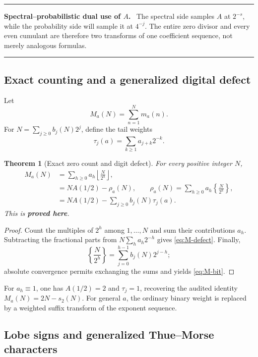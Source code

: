 \documentclass[11pt,oneside]{article}
\numberwithin{equation}{section}
\newtheorem{theorem}{Theorem}[section]
\theoremstyle{definition}
\theoremstyle{remark}
\newcommand{\statusproved}{\textcolor{deepgreen}{\textbf{proved here}}}
\newenvironment{resultbox}[1]{%
  \par\medskip\noindent\begin{center}\begin{minipage}{0.94\textwidth}%
  \color{deepgreen}\hrule\vspace{0.65em}%
  \color{black}\textbf{\color{deepgreen}#1.}\ }{%
  \par\vspace{0.65em}\color{deepgreen}\hrule
  \end{minipage}\end{center}\medskip}
\begin{document}
\begin{resultbox}{Spectral--probabilistic dual use of $A$}
The spectral side samples $A$ at $2^{-s}$, while the probability side will sample it at
$4^{-j}$.  The entire zero divisor and every even cumulant are therefore two transforms of
one coefficient sequence, not merely analogous formulas.
\end{resultbox}

\subsection{Exact counting and a generalized digital defect}

Let
\begin{equation}
 M_a(N)=\sum_{n=1}^{N}m_a(n).
 \label{eq:M-a}
\end{equation}
For $N=\sum_{j\ge0}b_j(N)2^j$, define the tail weights
\begin{equation}
 \tau_j(a)=\sum_{k\ge1}a_{j+k}2^{-k}.
 \label{eq:tau-j}
\end{equation}

\begin{theorem}[Exact zero count and digit defect]
\label{thm:digital-count}
For every positive integer $N$,
\begin{align}
 M_a(N)
 &=\sum_{h\ge0}a_h\left\lfloor\frac{N}{2^h}\right\rfloor,
 \label{eq:M-floor}\\
 &=N A(1/2)-\rho_a(N),
 \qquad
 \rho_a(N)=\sum_{h\ge0}a_h\left\{\frac{N}{2^h}\right\},
 \label{eq:M-defect}\\
 &=N A(1/2)-\sum_{j\ge0}b_j(N)\tau_j(a).
 \label{eq:M-bit}
\end{align}
This is \statusproved.
\end{theorem}

\begin{proof}
Count the multiples of $2^h$ among $1,\ldots,N$ and sum their contributions $a_h$.
Subtracting the fractional parts from $N\sum_ha_h2^{-h}$ gives \eqref{eq:M-defect}.
Finally,
\[
 \left\{\frac{N}{2^h}\right\}
 =\sum_{j=0}^{h-1}b_j(N)2^{j-h};
\]
absolute convergence permits exchanging the sums and yields \eqref{eq:M-bit}.
\end{proof}

For $a_h\equiv1$, one has $A(1/2)=2$ and $\tau_j=1$, recovering the audited identity
$M_a(N)=2N-s_2(N)$.  For general $a$, the ordinary binary weight is replaced by a weighted
suffix transform of the exponent sequence.

\subsection{Lobe signs and generalized Thue--Morse characters}
\end{document}
